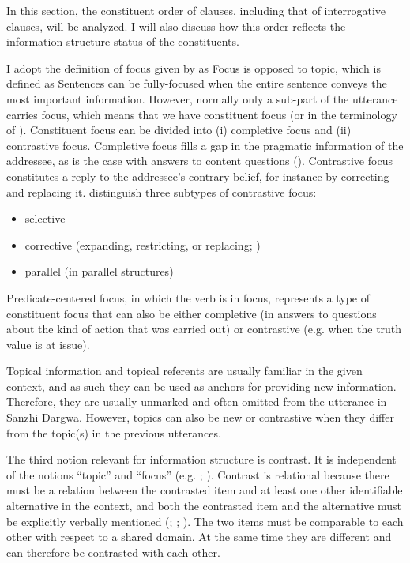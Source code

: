 In this section, the constituent order of clauses, including that of interrogative clauses, will be analyzed. I will also discuss how this order reflects the information structure status of the constituents.

I adopt the definition of focus given by \citet{Diketal1981} as  Focus is opposed to topic, which is defined as  Sentences can be fully-focused when the entire sentence conveys the most important information. However, normally only a sub-part of the utterance carries focus, which means that we have constituent focus (or  in the terminology of \citealp{Diketal1981}). Constituent focus can be divided into (i) completive focus and (ii) contrastive focus. Completive focus fills a gap in the pragmatic information of the addressee, as is the case with answers to content questions (). Contrastive focus constitutes a reply to the addressee's contrary belief, for instance by correcting and replacing it.  distinguish three subtypes of contrastive focus:
%
\begin{itemize}
	\item	selective
	\item	corrective (expanding, restricting, or replacing; )
	\item	parallel (in parallel structures)
\end{itemize}

Predicate-centered focus, in which the verb is in focus, represents a type of constituent focus that can also be either completive (in answers to questions about the kind of action that was carried out) or contrastive (e.g. when the truth value is at issue).

Topical information and topical referents are usually familiar in the given context, and as such they can be used as anchors for providing new information. Therefore, they are usually unmarked and often omitted from the utterance in Sanzhi Dargwa. However, topics can also be new or contrastive when they differ from the topic(s) in the previous utterances.

The third notion relevant for information structure is contrast. It is independent of the notions ``topic'' and ``focus'' (e.g. \citealt{Vallduvi.Vilkuna1998}; \citealt{Neeleman.etal2009}). Contrast is relational because there must be a relation between the contrasted item and at least one other identifiable alternative in the context, and both the contrasted item and the alternative must be explicitly verbally mentioned (\citealt{Malchukov2004}; \citealt{Izutsu2008}; \citealt{Repp2010}). The two items must be comparable to each other with respect to a shared domain. At the same time they are different and can therefore be contrasted with each other.


